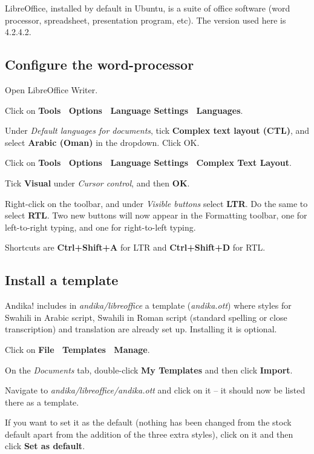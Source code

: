 \documentclass[a4paper,10pt, oneside]{book}
\begin{document}
LibreOffice, installed by default in Ubuntu, is a suite of office software (word processor, spreadsheet, presentation program, etc).  The version used here is 4.2.4.2.

\subsection{Configure the word-processor}

Open LibreOffice Writer.

Click on \textbf{Tools \textrightarrow\ Options \textrightarrow\ Language Settings \textrightarrow\ Languages}.

Under \textit{Default languages for documents}, tick \textbf{Complex text layout (CTL)}, and select \textbf{Arabic (Oman)} in the dropdown.  Click OK.

Click on \textbf{Tools \textrightarrow\ Options \textrightarrow\ Language Settings \textrightarrow\ Complex Text Layout}.

Tick \textbf{Visual} under \textit{Cursor control}, and then \textbf{OK}.

Right-click on the toolbar, and under \textit{Visible buttons} select \textbf{LTR}.  Do the same to select \textbf{RTL}.  Two new buttons will now appear in the Formatting toolbar, one for left-to-right typing, and one for right-to-left typing.

Shortcuts are \textbf{Ctrl+Shift+A} for LTR and \textbf{Ctrl+Shift+D} for RTL.

\subsection{Install a template}

Andika! includes in \textit{andika/libreoffice} a template (\textit{andika.ott}) where styles for Swahili in Arabic script, Swahili in Roman script (standard spelling or close transcription) and translation are already set up.  Installing it is optional.

Click on \textbf{File \textrightarrow\ Templates \textrightarrow\ Manage}.

On the \textit{Documents} tab, double-click \textbf{My Templates} and then click \textbf{Import}.

Navigate to \textit{andika/libreoffice/andika.ott} and click on it -- it should now be listed there as a template.

If you want to set it as the default (nothing has been changed from the stock default apart from the addition of the three extra styles), click on it and then click \textbf{Set as default}.
\end{document}
